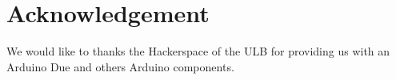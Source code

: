 \section{Acknowledgement}

We would like to thanks the Hackerspace of the ULB for providing us with an Arduino Due and others Arduino components.
